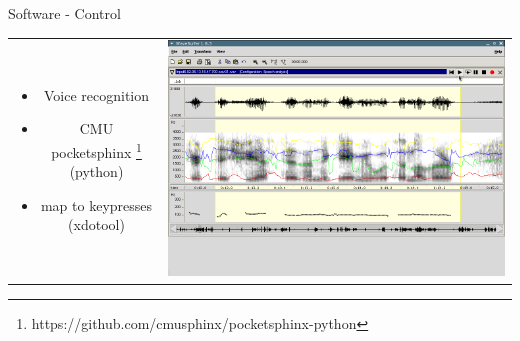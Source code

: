 \documentclass[xcolor=svgnames,handout,aspectratio=169]{beamer}
\begin{document}
\begin{frame}
	{Software - Control}

	\begin{tabular}{cl}  
			\parbox{0.35\linewidth}{
				\begin{itemize}
					\item Voice recognition
					\item CMU pocketsphinx \footnote{https://github.com/cmusphinx/pocketsphinx-python} (python)
					\item map to keypresses (xdotool)
				\end{itemize}
			}&
			\parbox{0.6\linewidth}{			
				\includegraphics[width=\linewidth]{images/waveform}
			}
		\end{tabular}
\end{frame}
\end{document}
